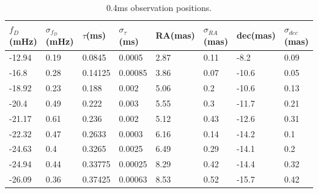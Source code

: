 \documentclass[useAMS,usenatbib]{mn2e}
\begin{document}
\begin{table}
\label{apex_0_4ms}
\begin{tabular}{|l|l|l|l|l|l|l|l|}
\hline
 $f_D$ (mHz) & $\sigma_{f_D}$(mHz) & $\tau$(ms) & $\sigma_{\tau}$ (ms) & RA(mas) & $\sigma_{RA}$(mas) & dec(mas) & $\sigma_{dec}$(mas) \\
\hline
-12.94                            & 0.19      & 0.0845  & 0.0005          & 2.87    & 0.11                                     & -8.2     & 0.09                                      \\
\hline
-16.8                             & 0.28      & 0.14125 & 0.00085         & 3.86    & 0.07                                     & -10.6    & 0.05                                      \\
\hline
-18.92                            & 0.23      & 0.188   & 0.002           & 5.06    & 0.2                                      & -10.6    & 0.13                                      \\
\hline
-20.4                             & 0.49      & 0.222   & 0.003           & 5.55    & 0.3                                      & -11.7    & 0.21                                      \\
\hline
-21.17                            & 0.61      & 0.236   & 0.002           & 5.12    & 0.43                                     & -12.6    & 0.31                                      \\
\hline
-22.32                            & 0.47      & 0.2633  & 0.0003          & 6.16    & 0.14                                     & -14.2    & 0.1                                       \\
\hline
-24.63                            & 0.4       & 0.3265  & 0.0025          & 6.49    & 0.29                                     & -14.1    & 0.2                                       \\
\hline
-24.94                            & 0.44      & 0.33775 & 0.00025         & 8.29    & 0.42                                     & -14.4    & 0.32                                      \\
\hline
-26.09                            & 0.36      & 0.37425 & 0.00063         & 8.53    & 0.52                                     & -15.7    & 0.42                                     
\end{tabular}
\caption{0.4ms observation positions.}
\end{table}
\end{document}
